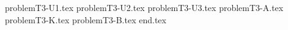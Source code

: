 \documentclass{../../../../style/mkimain}
\begin{document}
{problemT3-U1.tex}
{problemT3-U2.tex}
{problemT3-U3.tex}
{problemT3-A.tex}
\newpage
{problemT3-K.tex}
{problemT3-B.tex}
{end.tex}
\end{document}
